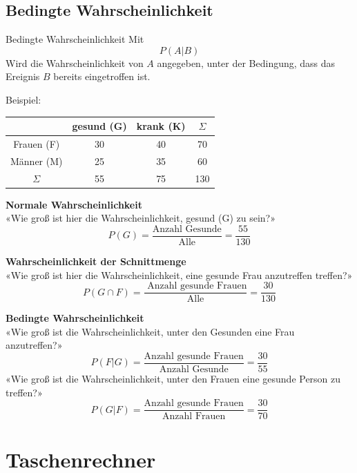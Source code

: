 \begin{multicols}{2}


\forceCB
\subsection*{Bedingte Wahrscheinlichkeit}

\begin{definition*}{Bedingte Wahrscheinlichkeit}{}
Mit
$$P(A|B)$$
Wird die Wahrscheinlichkeit von $A$ angegeben, unter der Bedingung,
dass das Ereignis $B$ bereits eingetroffen ist.
\end{definition*}

Beispiel:

\begin{tabular}{c|c|c|c}
           & gesund (G)& krank (K)& $\Sigma$ \\\hline
Frauen (F) &        30 &       40 &       70 \\\hline
Männer (M) &        25 &       35 &       60 \\\hline
$\Sigma$   &        55 &       75 &      130 \\\hline
 \end{tabular}

\textbf{Normale Wahrscheinlichkeit}\\
«Wie groß ist hier die Wahrscheinlichkeit, gesund (G) zu sein?»
$$P(G) = \frac{\textrm{Anzahl Gesunde}}{\textrm{Alle}} =  \frac{55}{130}$$

\textbf{Wahrscheinlichkeit der Schnittmenge}\\
«Wie groß ist hier die Wahrscheinlichkeit, eine gesunde Frau anzutreffen treffen?»
$$P(G\cap F) = \frac{\textrm{\ Anzahl gesunde Frauen}}{\textrm{Alle}}= \frac{30}{130}$$

\textbf{Bedingte Wahrscheinlichkeit}\\
«Wie groß ist die Wahrscheinlichkeit, unter den Gesunden eine Frau anzutreffen?»
$$P(F | G) = \frac{\textrm{Anzahl gesunde Frauen}}{\textrm{Anzahl Gesunde}} =  \frac{30}{55}$$
«Wie groß ist die Wahrscheinlichkeit, unter den Frauen eine gesunde Person zu treffen?»
$$P(G | F) = \frac{\textrm{Anzahl gesunde Frauen}}{\textrm{Anzahl Frauen}}=  \frac{30}{70}$$


\end{multicols}


\newpage


\section*{Taschenrechner}

